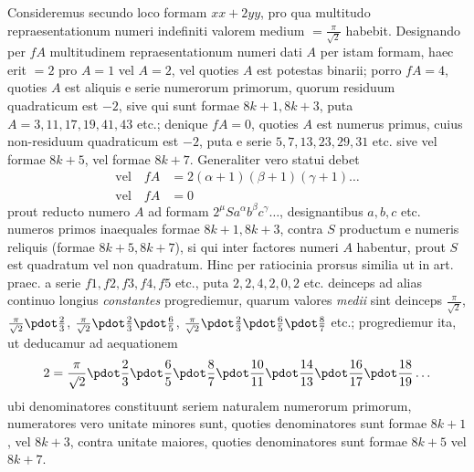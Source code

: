Consideremus secundo loco formam $xx+2yy$, pro qua multitudo repraesentationum numeri indefiniti valorem medium $=\frac\pi{\surd2}$ habebit. Designando per $fA$ multitudinem repraesentationum numeri dati $A$ per istam formam, haec erit $=2$ pro $A=1$ vel $A=2$, vel quoties $A$ est potestas binarii; porro $fA=4$, quoties $A$ est aliquis e serie numerorum primorum, quorum residuum quadraticum est $-2$, sive qui sunt formae $8k+1,8k+3$, puta $A=3,11,17,19,41,43$ etc.; denique $fA=0$, quoties $A$ est numerus primus, cuius non-residuum quadraticum est $-2$, puta e serie $5,7,13,23,29,31$ etc. sive vel formae $8k+5$, vel formae $8k+7$. Generaliter vero statui debet
\[
\begin{aligned}
\text{vel}\quad fA&=2(\alpha+1)(\beta+1)(\gamma+1)\ldots\\
\text{vel}\quad fA&=0
\end{aligned}
\]
prout reducto numero $A$ ad formam $2^\mu Sa^\alpha b^\beta c^\gamma\ldots$, designantibus $a,b,c$ etc. numeros primos inaequales formae $8k+1,8k+3$, contra $S$ productum e 
numeris reliquis (formae $8k+5,8k+7$), si qui inter factores numeri $A$ habentur, prout $S$ est quadratum vel non quadratum. Hinc per ratiocinia prorsus similia ut in art. praec. a serie $f1,f2,f3,f4,f5$ etc., puta $2,2,4,2,0,2$ etc. deinceps ad alias continuo longius \emph{constantes} progrediemur, quarum valores \emph{medii} sint deinceps $\frac\pi{\surd2}$, $\frac\pi{\surd2}\pdot\frac23$, $\frac\pi{\surd2}\pdot\frac23\pdot\frac65$, $\frac\pi{\surd2}\pdot\frac23\pdot\frac65\pdot\frac87$ etc.; progrediemur ita, ut deducamur ad aequationem
\[
2=\frac\pi{\surd2}\pdot\frac23\pdot\frac65\pdot\frac87\pdot\frac{10}{11}\pdot\frac{14}{13}\pdot\frac{16}{17}\pdot\frac{18}{19}\ldots
\]
ubi denominatores constituunt seriem naturalem numerorum primorum, numeratores vero unitate minores sunt, quoties denominatores sunt formae $8k+1$, vel $8k+3$, contra unitate maiores, quoties denominatores sunt formae $8k+5$ vel $8k+7$.

